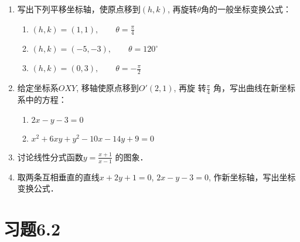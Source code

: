 \begin{ex}
\begin{enumerate}
    \item 写出下列平移坐标轴，使原点移到$(h,k)$, 再旋转$\theta$角的一般坐标变换公式：
\begin{enumerate}
    \item $(h,k)=(1,1),\qquad \theta=\frac{\pi}{4}$
    \item $(h,k)=(-5,-3),\qquad \theta=120^{\circ}$
    \item $(h,k)=(0,3),\qquad \theta=-\frac{\pi}{2}$
\end{enumerate}

\item 给定坐标系$OXY$, 移轴使原点移到$O'(2,1)$, 再旋
    转$\frac{\pi}{4}$
    角，写出曲线在新坐标系中的方程：
\begin{enumerate}
    \item $2x-y-3=0$
    \item $x^2+6xy+y^2-10x-14y+9=0$
\end{enumerate}
\item     讨论线性分式函数$y=\frac{x+1}{x-1}$
的图象．
\item 取两条互相垂直的直线$x+2y+1=0$, $2x-y-3=0$, 
作新坐标轴，写出坐标变换公式．
\end{enumerate}
\end{ex}

\section*{习题6.2}



